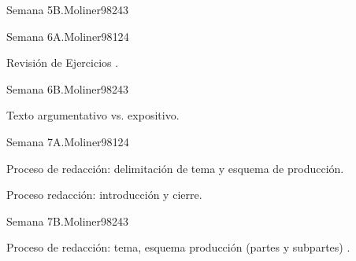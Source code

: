 \begin{syllabus}
\begin{unit}{Semana 5B.}{Moliner98}{24}{3}
   \begin{learningoutcomes}
      \item 
      \item
      \item 
      \end{learningoutcomes}
\end{unit}

\begin{unit}{Semana 6A.}{Moliner98}{12}{4}
   \begin{topics}
      \item Revisión de Ejercicios .
   \end{topics}
   \begin{learningoutcomes}
      \item 
   \end{learningoutcomes}
\end{unit}

\begin{unit}{Semana 6B.}{Moliner98}{24}{3}
   \begin{topics}
      \item Texto argumentativo vs. expositivo.
   \end{topics}

   \begin{learningoutcomes}
      \item 
      \item
      \item 
      \end{learningoutcomes}
\end{unit}

\begin{unit}{Semana 7A.}{Moliner98}{12}{4}
   \begin{topics}
      \item Proceso de redacción: delimitación de tema y esquema de producción.
      \item Proceso redacción: introducción y cierre.
   \end{topics}
   \begin{learningoutcomes}
      \item 
   \end{learningoutcomes}
\end{unit}

\begin{unit}{Semana 7B.}{Moliner98}{24}{3}
   \begin{topics}
      \item Proceso de redacción: tema, esquema producción (partes y subpartes) . 
   \end{topics}


\end{unit}
\end{syllabus}
